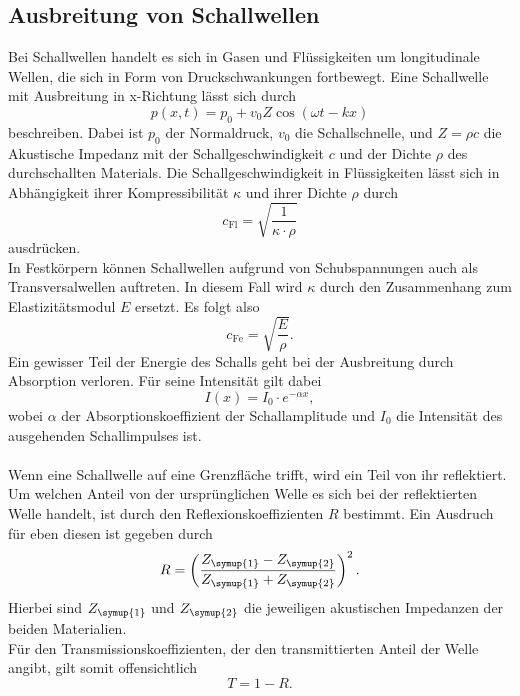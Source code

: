 \subsection{Ausbreitung von Schallwellen}
\label{sec:Schallwellen}
Bei Schallwellen handelt es sich in Gasen und Flüssigkeiten um longitudinale Wellen, die sich in Form von Druckschwankungen fortbewegt.
Eine Schallwelle mit Ausbreitung in x-Richtung lässt sich durch
\begin{equation}
    p(x, t) = p_0 + v_0 Z \cos{(\omega t - kx)}
\end{equation}
beschreiben. Dabei ist $p_0$ der Normaldruck, $v_0$ die Schallschnelle, und $Z=\rho c$ die Akustische
Impedanz mit der Schallgeschwindigkeit $c$ und der Dichte $\rho$ des durchschallten Materials.
Die Schallgeschwindigkeit in Flüssigkeiten lässt sich in Abhängigkeit ihrer Kompressibilität $\kappa$ und ihrer
Dichte $\rho$ durch
\begin{equation}
    c_{\mathrm{Fl}} = \sqrt{\frac{1}{\kappa \cdot \rho}}
\end{equation}
ausdrücken. \\
In Festkörpern können Schallwellen aufgrund von Schubspannungen auch als Transversalwellen auftreten. In diesem Fall wird 
$\kappa$ durch den Zusammenhang zum Elastizitätsmodul $E$ ersetzt. Es folgt also
\begin{equation}
    c_{\mathrm{Fe}} = \sqrt{\frac{E}{\rho}}.
\end{equation}
Ein gewisser Teil der Energie des Schalls geht bei der Ausbreitung durch Absorption verloren. Für seine Intensität gilt dabei
\begin{equation}
    \label{eqn:Dämpfung}
    I(x) = I_0 \cdot e^{-\alpha x},
\end{equation}
wobei $\alpha$ der Absorptionskoeffizient der Schallamplitude und $I_0$ die Intensität des ausgehenden 
Schallimpulses ist.\\
\\
Wenn eine Schallwelle auf eine Grenzfläche trifft, wird ein Teil von ihr reflektiert. Um welchen Anteil von der ursprünglichen Welle es sich bei der
reflektierten Welle handelt, ist durch den Reflexionskoeffizienten $R$ bestimmt. Ein Ausdruch für eben diesen ist gegeben durch
\begin{equation}
    R = \left(\frac{Z_{\symup{1}}- Z_{\symup{2}}}{Z_{\symup{1}}+Z_{\symup{2}}}\right)^2.
\end{equation}
Hierbei sind $Z_{\symup{1}}$ und $Z_{\symup{2}}$ die jeweiligen akustischen Impedanzen der beiden Materialien. \\
Für den Transmissionskoeffizienten, der den transmittierten Anteil der Welle angibt, gilt somit offensichtlich
\begin{equation}
    T = 1 - R.
\end{equation}


